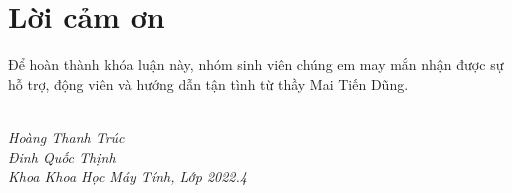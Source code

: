 \chapter*{\centering\Large{Lời cảm ơn}}
Để hoàn thành khóa luận này, nhóm sinh viên chúng em may mắn nhận được sự hỗ trợ, động viên và hướng dẫn tận tình từ thầy Mai Tiến Dũng. \\

\begin{flushright}
 \\
\textit {Hoàng Thanh Trúc} \\
\textit {Đinh Quốc Thịnh } \\
\textit {Khoa Khoa Học Máy Tính, Lớp 2022.4 }
\end{flushright}

